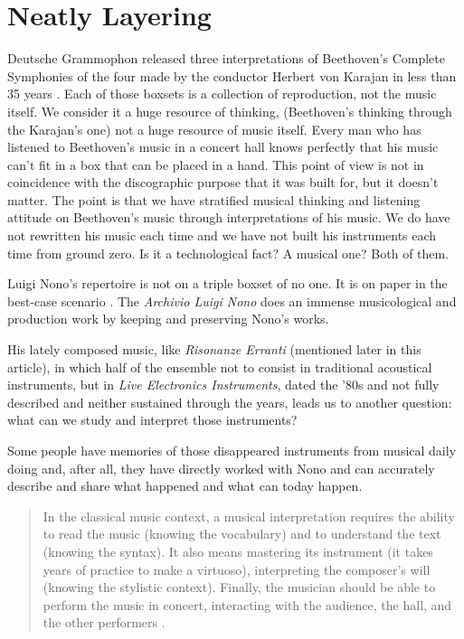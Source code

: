 \documentclass[twoside,a4paper]{article}
\begin{document}
\section{Neatly Layering}
\label{sec:layering}

Deutsche Grammophon released three interpretations of Beethoven's Complete
Symphonies of the four made by the conductor Herbert von Karajan in less than
35 years \cite{rrrnyt}. Each of those boxsets is a collection of reproduction,
not the music itself. We consider it a huge resource of thinking, (Beethoven's
thinking through the Karajan's one) not a huge resource of music itself. Every
man who has listened to Beethoven's music in a concert hall knows perfectly that
his music can't fit in a box that can be placed in a hand. This point of view is
not in coincidence with the discographic purpose that it was built for, but it
doesn't matter. The point is that we have stratified musical thinking and
listening attitude on Beethoven's music through interpretations of his music.
We do have not rewritten his music each time and we have not built his instruments
each time from ground zero. Is it a technological fact? A musical one? Both of
them.

Luigi Nono's repertoire is not on a triple boxset of no one. It is on paper in
the best-case scenario \cite{raprmt}. The \emph{Archivio Luigi Nono} does an
immense musicological and production work by keeping and preserving Nono's works.

His lately composed music, like \emph{Risonanze Erranti} (mentioned later in this
article), in which half of the ensemble not to consist in traditional acoustical
instruments, but in \emph{Live Electronics Instruments}, dated the '80s and not
fully described and neither sustained through the years, leads us to another
question: what can we study and interpret those instruments?


Some people have memories of those disappeared instruments from musical daily
doing and, after all, they have directly worked with Nono and can accurately
describe and share what happened and what can today happen.

\begin{quote}
In the classical music context, a musical interpretation requires the ability to
read the music (knowing the vocabulary) and to understand the text (knowing the
syntax). It also means mastering its instrument (it takes years of practice to
make a virtuoso), interpreting the composer's will (knowing the stylistic context).
Finally, the musician should be able to perform the music in concert, interacting
with the audience, the hall, and the other performers \cite{lem16}.
\end{quote}
\end{document}
